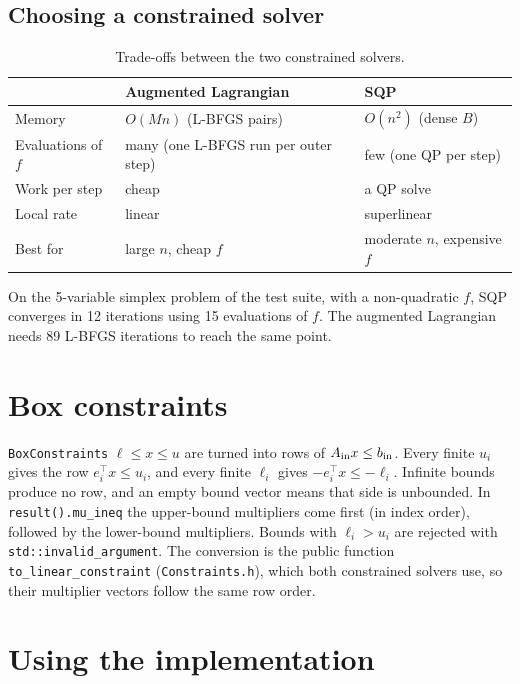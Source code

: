 \subsection{Choosing a constrained solver}
\begin{table}[ht]
\centering
\begin{tabular}{@{}l>{\raggedright\arraybackslash}p{5.2cm}>{\raggedright\arraybackslash}p{5.2cm}@{}}
\toprule
 & Augmented Lagrangian & SQP \\
\midrule
Memory & $O(Mn)$ (L-BFGS pairs) & $O(n^2)$ (dense $B$) \\
Evaluations of $f$ & many (one L-BFGS run per outer step) & few (one QP per step) \\
Work per step & cheap & a QP solve \\
Local rate & linear & superlinear \\
Best for & large $n$, cheap $f$ & moderate $n$, expensive $f$ \\
\bottomrule
\end{tabular}
\caption{Trade-offs between the two constrained solvers.}
\end{table}
On the 5-variable simplex problem of the test suite, with a non-quadratic $f$, SQP converges in 12
iterations using 15 evaluations of $f$. The augmented Lagrangian
needs 89 L-BFGS iterations to reach the same point.

\section{Box constraints}\label{co:sec:box}

\texttt{BoxConstraints} $\ell\le x\le u$ are turned into rows of $A_{\mathrm{in}} x\le b_{\mathrm{in}}$.
Every finite $u_i$ gives the row $e_i^\top x\le u_i$, and every finite $\ell_i$ gives
$-e_i^\top x\le-\ell_i$. Infinite bounds produce no row, and an empty bound
vector means that side is unbounded. In \texttt{result().mu\_ineq} the upper-bound
multipliers come first (in index order), followed by the lower-bound
multipliers.
Bounds with $\ell_i>u_i$ are rejected with \texttt{std::invalid\_argument}.
The conversion is the public function \texttt{to\_linear\_constraint}
(\texttt{Constraints.h}), which both constrained solvers use, so their
multiplier vectors follow the same row order.

\section{Using the implementation}

